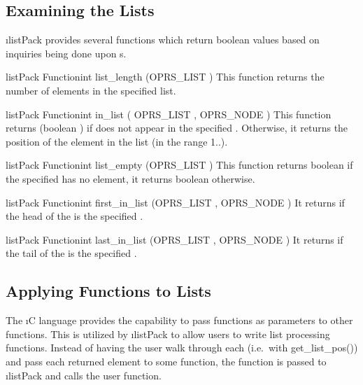 \subsection{Examining the Lists}

\i{listPack} provides several functions which return boolean values
based on inquiries being done upon s.

\begin{typefn}{listPack Function}{int} {list\_length} {(OPRS\_LIST )}
This function returns the number of elements in the specified list.
\end{typefn}

\begin{typefn}{listPack Function}{int} {in\_list} {( OPRS\_LIST , OPRS\_NODE
)}
This function returns  (boolean ) if  does not appear in the specified .
Otherwise, it returns the position of the element in the list (in the range
1..).
\end{typefn}

\begin{typefn}{listPack Function}{int} {list\_empty} {(OPRS\_LIST )}
This function returns boolean  if the specified  has no
element, it returns boolean  otherwise.
\end{typefn}

\begin{typefn}{listPack Function}{int} {first\_in\_list} {(OPRS\_LIST , OPRS\_NODE
)}
It returns  if the head of the  is the specified
.
\end{typefn}

\begin{typefn}{listPack Function}{int} {last\_in\_list} {(OPRS\_LIST , OPRS\_NODE
)}
It returns  if the tail of the  is the specified
.
\end{typefn}

\subsection{Applying Functions to Lists}

The \i{C} language provides the capability to pass functions as parameters to
other functions. This is utilized by \i{listPack} to allow users to write list
processing functions. Instead of having the user walk through each
 (i.e.\ with get\_list\_pos()) and pass each returned element to
some function, the function is passed to \i{listPack} and calls the user
function.

